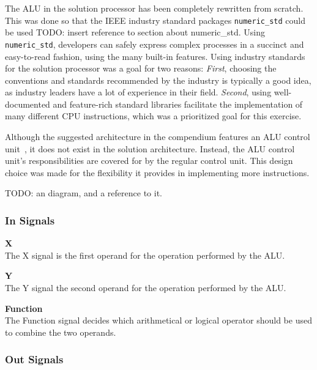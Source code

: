 The ALU in the solution processor has been completely rewritten from scratch.
This was done so that the IEEE industry standard packages \texttt{numeric\_std} could be used TODO: insert reference to section about numeric_std.
Using \texttt{numeric\_std}, developers can safely express complex processes in a succinct and easy-to-read fashion, using the many built-in features.
Using industry standards for the solution processor was a goal for two reasons:
\textit{First}, choosing the conventions and standards recommended by the industry is typically a good idea, as industry leaders have a lot of experience in their field.
\textit{Second}, using well-documented and feature-rich standard libraries facilitate the implementation of many different CPU instructions, which was a prioritized goal for this exercise.

Although the suggested architecture in the compendium features an ALU control unit~\cite[p.115]{compendium}, it does not exist in the solution architecture.
Instead, the ALU control unit's responsibilities are covered for by the regular control unit.
This design choice was made for the flexibility it provides in implementing more instructions.

TODO: an diagram, and a reference to it.

\subsubsection{In Signals}

\begin{description}
\item{\textbf{X}} \\
The X signal is the first operand for the operation performed by the ALU.

\item{\textbf{Y}} \\
The Y signal the second operand for the operation performed by the ALU.

\item{\textbf{Function}} \\
The Function signal decides which arithmetical or logical operator should be used to combine the two operands.
\end{description}

\subsubsection{Out Signals}

